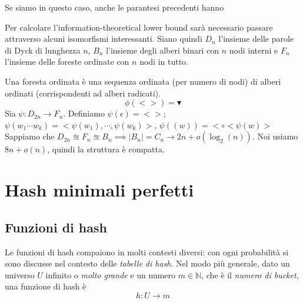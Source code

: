 Se siamo in questo caso, anche le parantesi precedenti hanno

Per calcolare l'information-theoretical lower bound sarà necessario passare attraverso alcuni isomorfismi
interessanti. Siano quindi $D_n$ l'insieme delle parole di Dyck di lunghezza $n$, $B_n$ l'insieme degli
alberi binari con $n$ nodi interni e $F_n$ l'insieme delle foreste ordinate con $n$ nodi in tutto.

Una foresta ordinata è una sequenza ordinata (per numero di nodi) di alberi ordinati (corrispondenti
ad alberi radicati).
$$
	\phi(<>) = \blacktriangledown
$$
Sia $\psi: D_{2n} \rightarrow F_n$.
Definiamo $\psi(\epsilon) = <>$; $\psi(w_1 \cdots w_k) =  <\psi(w_1), \cdots, \psi(w_k)>$, $\psi((w)) = <\circ < \psi(w) >$
Sappiamo che $D_{2n} \approxeq F_n \approxeq B_n \implies |B_n| = C_n \rightarrow 2n + o (\log_2(n))$.
Noi usiamo $8n + o(n)$, quindi la struttura è compatta.


\section{Hash minimali perfetti}
\subsection{Funzioni di hash}
Le funzioni di hash compaiono in molti contesti diversi: con ogni probabilità
si sono discusse nel contesto delle \textit{tabelle di hash}.
Nel modo più generale, dato un universo $U$ infinito o \textit{molto grande} e un numero $m \in \mathbb{N}$,
che è il \textit{numero di bucket}, una funzione di hash è
$$
	h: U \rightarrow m
$$

